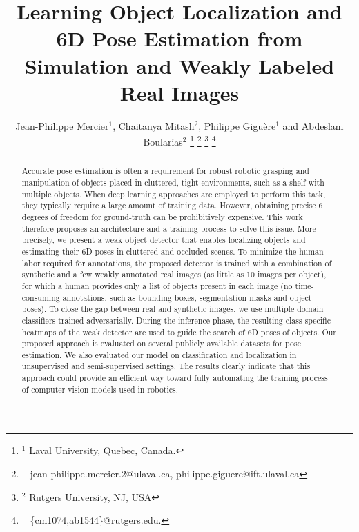 \documentclass[letterpaper, 10 pt, conference]{ieeeconf}  %
\title{\LARGE \bf
Learning Object Localization and 6D Pose Estimation from Simulation and Weakly Labeled Real Images
}
\author{Jean-Philippe Mercier$^{1}$, Chaitanya Mitash$^{2}$, Philippe Gigu\`ere$^{1}$ and Abdeslam Boularias$^{2}$%
 \thanks{$^{1}$ Laval University, Quebec, Canada.}
 \thanks{$\enspace $ jean-philippe.mercier.2@ulaval.ca, philippe.giguere@ift.ulaval.ca}
 \thanks{$^{2}$ Rutgers University, NJ, USA}%
 \thanks{$\enspace$ \{cm1074,ab1544\}@rutgers.edu.}
 }
\begin{document}
\maketitle
\thispagestyle{empty}
\pagestyle{empty}




\begin{abstract}
Accurate pose estimation is often a requirement for robust robotic grasping and manipulation of objects placed in cluttered, tight environments, such as a shelf with multiple objects. When deep learning approaches are employed to perform this task, they typically require a large amount of training data. However, obtaining precise 6 degrees of freedom for ground-truth can be prohibitively expensive. This work therefore proposes an architecture and a training process to solve this issue. More precisely, we present a weak object detector that enables localizing objects and estimating their 6D poses in cluttered and occluded scenes. To minimize the human labor required for annotations, the proposed detector is trained with a combination of synthetic and a few weakly annotated real images (as little as 10 images per object), for which a human provides only a list of objects present in each image (no time-consuming annotations, such as bounding boxes, segmentation masks and object poses). To close the gap between real and synthetic images, we use multiple domain classifiers trained adversarially. During the inference phase, the resulting class-specific heatmaps of the weak detector are used to guide the search of 6D poses of objects. Our proposed approach is evaluated on several publicly available datasets for pose estimation. We also evaluated our model on classification and localization in unsupervised and semi-supervised settings. The results clearly indicate that this approach could provide an efficient way toward fully automating the training process of computer vision models used in robotics.




\end{abstract}
\end{document}
